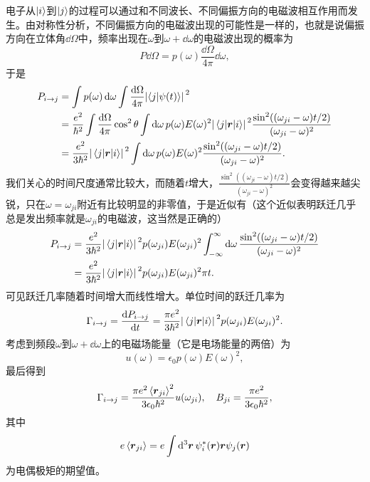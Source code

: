 电子从$\ket{i}$到$\ket{j}$的过程可以通过和不同波长、不同偏振方向的电磁波相互作用而发生。由对称性分析，不同偏振方向的电磁波出现的可能性是一样的，也就是说偏振方向在立体角$\dd{\Omega}$中，频率出现在$\omega$到$\omega+\dd{\omega}$的电磁波出现的概率为
\[
    P \dd{\Omega} = p(\omega) \frac{\dd{\Omega}}{4\pi} \dd{\omega},
\]
于是
\[
    \begin{aligned}
        P_{i \to j} &= \int p(\omega) \dd{\omega} \int \frac{\dd{\Omega}}{4\pi} \abs*{\braket{j}{\psi(t)}}^2 \\
        &= \frac{e^2}{\hbar^2} \int \frac{\dd{\Omega}}{4\pi} \cos^2 \theta \int \dd{\omega} p(\omega) E(\omega)^2 \abs*{\mel{j}{{\vb*{r}}}{i}}^2 \frac{\sin^2((\omega_{ji} - \omega) t / 2)}{(\omega_{ji}-\omega)^2} \\
        &= \frac{e^2}{3 \hbar^2} \abs*{\mel{j}{{\vb*{r}}}{i}}^2 \int \dd{\omega} p(\omega) E(\omega)^2 \frac{\sin^2((\omega_{ji} - \omega) t / 2)}{(\omega_{ji}-\omega)^2}.
    \end{aligned}
\]
我们关心的时间尺度通常比较大，而随着$t$增大，$\frac{\sin^2((\omega_{ji} - \omega) t / 2)}{(\omega_{ji}-\omega)^2}$会变得越来越尖锐，只在$\omega = \omega_{ji}$附近有比较明显的非零值，于是近似有（这个近似表明跃迁几乎总是发出频率就是$\omega_{ji}$的电磁波，这当然是正确的）
\[
    \begin{aligned}
        P_{i \to j} &= \frac{e^2}{3 \hbar^2} \abs*{\mel{j}{{\vb*{r}}}{i}}^2 p(\omega_{ji}) E(\omega_{ji})^2 \int_{-\infty}^\infty \dd{\omega} \frac{\sin^2((\omega_{ji} - \omega) t / 2)}{(\omega_{ji}-\omega)^2} \\
        &= \frac{e^2}{3 \hbar^2} \abs*{\mel{j}{{\vb*{r}}}{i}}^2 p(\omega_{ji}) E(\omega_{ji})^2 \pi t.
    \end{aligned}
\]
可见跃迁几率随着时间增大而线性增大。单位时间的跃迁几率为
\[
    \Gamma_{i \to j} = \dv{P_{i \to j}}{t} = \frac{\pi e^2}{3 \hbar^2} \abs*{\mel{j}{{\vb*{r}}}{i}}^2 p(\omega_{ji}) E(\omega_{ji})^2.
\]
考虑到频段$\omega$到$\omega+\dd{\omega}$上的电磁场能量（它是电场能量的两倍）为
\begin{equation}
    u(\omega) = \epsilon_0 p(\omega) E(\omega)^2,
\end{equation}
最后得到
\begin{equation}
    \Gamma_{i \to j} = \frac{\pi e^2 \expval*{\vb*{r}_{ji}}^2}{3 \epsilon_0 \hbar^2} u(\omega_{ji}), \quad B_{ji} = \frac{\pi e^2}{3 \epsilon_0 \hbar^2},
\end{equation}
其中
\begin{equation}
    e \expval*{\vb*{r}_{ji}} = e \int \dd[3]{\vb*{r}} \psi_i^*(\vb*{r}) \vb*{r} \psi_j(\vb*{r})
    \label{eq:electro-dipole}
\end{equation}
为电偶极矩的期望值。

